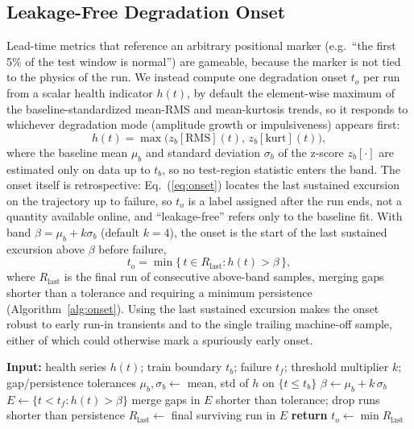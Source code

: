 \documentclass[IJPHM, 2026, 0]{PHMSociety}
\begin{document}
\subsection{Leakage-Free Degradation Onset}
\label{sec:onset}
Lead-time metrics that reference an arbitrary positional marker (e.g.\ ``the first 5\% of the test window is normal'') are gameable, because the marker is not tied to the physics of the run. We instead compute one degradation onset $t_o$ per run from a scalar health indicator $h(t)$, by default the element-wise maximum of the baseline-standardized mean-RMS and mean-kurtosis trends, so it responds to whichever degradation mode (amplitude growth or impulsiveness) appears first:
\begin{equation}
h(t) = \max\!\big(z_b[\text{RMS}](t),\, z_b[\text{kurt}](t)\big),
\label{eq:health}
\end{equation}
where the baseline mean $\mu_b$ and standard deviation $\sigma_b$ of the z-score $z_b[\cdot]$ are estimated only on data up to $t_b$, so no test-region statistic enters the band. The onset itself is retrospective: Eq.~(\ref{eq:onset}) locates the last sustained excursion on the trajectory up to failure, so $t_o$ is a label assigned after the run ends, not a quantity available online, and ``leakage-free'' refers only to the baseline fit. With band $\beta = \mu_b + k\sigma_b$ (default $k=4$), the onset is the start of the last sustained excursion above $\beta$ before failure,
\begin{equation}
t_o = \min\{\, t \in R_{\text{last}} : h(t) > \beta \,\},
\label{eq:onset}
\end{equation}
where $R_{\text{last}}$ is the final run of consecutive above-band samples, merging gaps shorter than a tolerance and requiring a minimum persistence (Algorithm~\ref{alg:onset}). Using the last sustained excursion makes the onset robust to early run-in transients and to the single trailing machine-off sample, either of which could otherwise mark a spuriously early onset.

\begin{algorithm}
\caption{Leakage-free terminal degradation onset}
\label{alg:onset}
\begin{algorithmic}[1]
\State \textbf{Input:} health series $h(t)$; train boundary $t_b$; failure $t_f$; threshold multiplier $k$; gap/persistence tolerances
\State $\mu_b, \sigma_b \gets$ mean, std of $h$ on $\{t \le t_b\}$
\State $\beta \gets \mu_b + k\,\sigma_b$
\State $E \gets \{t < t_f : h(t) > \beta\}$ 
\State merge gaps in $E$ shorter than tolerance; drop runs shorter than persistence
\State $R_{\text{last}} \gets$ final surviving run in $E$
\State \textbf{return} $t_o \gets \min R_{\text{last}}$
\end{algorithmic}
\end{algorithm}
\end{document}
